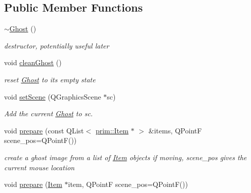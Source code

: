 \subsection*{Public Member Functions}
\begin{DoxyCompactItemize}
\item 
\hyperlink{classprim_1_1Ghost_ad2c6d5babda20b32619b8801c1f8d94a}{$\sim$\+Ghost} ()\hypertarget{classprim_1_1Ghost_ad2c6d5babda20b32619b8801c1f8d94a}{}\label{classprim_1_1Ghost_ad2c6d5babda20b32619b8801c1f8d94a}

\begin{DoxyCompactList}\small\item\em destructor, potentially useful later \end{DoxyCompactList}\item 
void \hyperlink{classprim_1_1Ghost_a4218723c157248b5d7336c7381110316}{clean\+Ghost} ()\hypertarget{classprim_1_1Ghost_a4218723c157248b5d7336c7381110316}{}\label{classprim_1_1Ghost_a4218723c157248b5d7336c7381110316}

\begin{DoxyCompactList}\small\item\em reset \hyperlink{classprim_1_1Ghost}{Ghost} to its empty state \end{DoxyCompactList}\item 
void \hyperlink{classprim_1_1Ghost_ad8b7351f2d73c9793f39571c79e3abcf}{set\+Scene} (Q\+Graphics\+Scene $\ast$sc)\hypertarget{classprim_1_1Ghost_ad8b7351f2d73c9793f39571c79e3abcf}{}\label{classprim_1_1Ghost_ad8b7351f2d73c9793f39571c79e3abcf}

\begin{DoxyCompactList}\small\item\em Add the current \hyperlink{classprim_1_1Ghost}{Ghost} to sc. \end{DoxyCompactList}\item 
void \hyperlink{classprim_1_1Ghost_a61f8b226d0feb571f0cba1d27029c231}{prepare} (const Q\+List$<$ \hyperlink{classprim_1_1Item}{prim\+::\+Item} $\ast$ $>$ \&items, Q\+PointF scene\+\_\+pos=Q\+PointF())\hypertarget{classprim_1_1Ghost_a61f8b226d0feb571f0cba1d27029c231}{}\label{classprim_1_1Ghost_a61f8b226d0feb571f0cba1d27029c231}

\begin{DoxyCompactList}\small\item\em create a ghost image from a list of \hyperlink{classprim_1_1Item}{Item} objects if moving, scene\+\_\+pos gives the current mouse location \end{DoxyCompactList}\item 
void \hyperlink{classprim_1_1Ghost_a8e92d9b86e2f9ebcdf2849de63fb87f9}{prepare} (\hyperlink{classprim_1_1Item}{Item} $\ast$item, Q\+PointF scene\+\_\+pos=Q\+PointF())\hypertarget{classprim_1_1Ghost_a8e92d9b86e2f9ebcdf2849de63fb87f9}{}\label{classprim_1_1Ghost_a8e92d9b86e2f9ebcdf2849de63fb87f9}


\end{DoxyCompactItemize}
